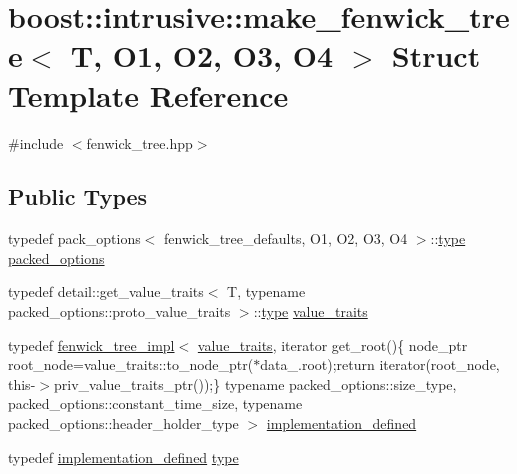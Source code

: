 \hypertarget{structboost_1_1intrusive_1_1make__fenwick__tree}{}\section{boost\+:\+:intrusive\+:\+:make\+\_\+fenwick\+\_\+tree$<$ T, O1, O2, O3, O4 $>$ Struct Template Reference}
\label{structboost_1_1intrusive_1_1make__fenwick__tree}


{\ttfamily \#include $<$fenwick\+\_\+tree.\+hpp$>$}

\subsection*{Public Types}
\begin{DoxyCompactItemize}
\item 
typedef pack\+\_\+options$<$ fenwick\+\_\+tree\+\_\+defaults, O1, O2, O3, O4 $>$\+::\hyperlink{structboost_1_1intrusive_1_1make__fenwick__tree_a174edb4a4fedde7b29f7aa9362d37ac0}{type} \hyperlink{structboost_1_1intrusive_1_1make__fenwick__tree_affdbeb1683bbfebf917e9a35cbd31b81}{packed\+\_\+options}
\item 
typedef detail\+::get\+\_\+value\+\_\+traits$<$ T, typename packed\+\_\+options\+::proto\+\_\+value\+\_\+traits $>$\+::\hyperlink{structboost_1_1intrusive_1_1make__fenwick__tree_a174edb4a4fedde7b29f7aa9362d37ac0}{type} \hyperlink{structboost_1_1intrusive_1_1make__fenwick__tree_a3ee00a7f2c43d65e29ad42d24f33235a}{value\+\_\+traits}
\item 
typedef \hyperlink{classboost_1_1intrusive_1_1fenwick__tree__impl}{fenwick\+\_\+tree\+\_\+impl}$<$ \hyperlink{structboost_1_1intrusive_1_1make__fenwick__tree_a3ee00a7f2c43d65e29ad42d24f33235a}{value\+\_\+traits}, iterator get\+\_\+root()\{ node\+\_\+ptr root\+\_\+node=value\+\_\+traits\+::to\+\_\+node\+\_\+ptr($\ast$data\+\_\+.\+root);return iterator(root\+\_\+node, this-\/$>$priv\+\_\+value\+\_\+traits\+\_\+ptr());\} typename packed\+\_\+options\+::size\+\_\+type, packed\+\_\+options\+::constant\+\_\+time\+\_\+size, typename packed\+\_\+options\+::header\+\_\+holder\+\_\+type $>$ \hyperlink{structboost_1_1intrusive_1_1make__fenwick__tree_af7a268a01bc7f0ae30cabfd6bf2be546}{implementation\+\_\+defined}
\item 
typedef \hyperlink{structboost_1_1intrusive_1_1make__fenwick__tree_af7a268a01bc7f0ae30cabfd6bf2be546}{implementation\+\_\+defined} \hyperlink{structboost_1_1intrusive_1_1make__fenwick__tree_a174edb4a4fedde7b29f7aa9362d37ac0}{type}
\end{DoxyCompactItemize}


